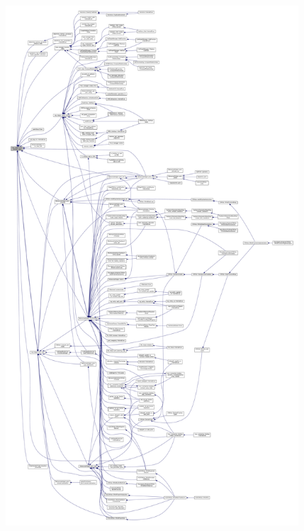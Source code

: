 \begin{figure}[H]
\begin{center}
\leavevmode
\includegraphics[height=550pt]{d7/d99/classtree__helper_a81bf6caaec59373f9e1a5690de590b40_icgraph}
\end{center}
\end{figure}
\mbox{\label{classtree__helper_ae3199a84c9560139e1bbbaf3b5b1e519}} 
